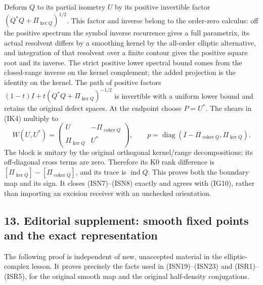 \documentclass[
  11pt,
]{article}
\begin{document}
Deform \(Q\) to its partial isometry \(U\) by its positive invertible
factor \((Q^*Q+\Pi_{\ker Q})^{1/2}\). This factor and inverse belong to
the order-zero calculus: off the positive spectrum the symbol inverse
recurrence gives a full parametrix, its actual resolvent differs by a
smoothing kernel by the all-order elliptic alternative, and integration
of that resolvent over a finite contour gives the positive square root
and its inverse. The strict positive lower spectral bound comes from the
closed-range inverse on the kernel complement; the added projection is
the identity on the kernel. The path of positive factors
\((1-t)I+t(Q^*Q+\Pi_{\ker Q})^{-1/2}\) is invertible with a uniform
lower bound and retains the original defect spaces. At the endpoint
choose \(P=U^*\). The shears in (IK4) multiply to \[
 W(U,U^*)=
 \begin{pmatrix}U&-\Pi_{\operatorname{coker}Q}\\
                 \Pi_{\ker Q}&U^*\end{pmatrix},\qquad
 p=\operatorname{diag}(I-\Pi_{\operatorname{coker}Q},\Pi_{\ker Q}).
\tag{IK5}
\] The block is unitary by the original orthogonal kernel/range
decompositions; its off-diagonal cross terms are zero. Therefore its K0
rank difference is \([\Pi_{\ker Q}]-[\Pi_{\operatorname{coker}Q}]\), and
its trace is \(\operatorname{ind}Q\). This proves both the boundary map
and its sign. It closes (ISN7)--(ISN8) exactly and agrees with (IG10),
rather than importing an excision receiver with an unchecked
orientation.

\subsection{13. Editorial supplement: smooth fixed points and the exact
representation}\label{editorial-supplement-smooth-fixed-points-and-the-exact-representation}

The following proof is independent of new, unaccepted material in the
elliptic-complex lesson. It proves precisely the facts used in
(ISN19)--(ISN23) and (ISR1)--(ISR5), for the original smooth map and the
original half-density conjugations.
\end{document}
